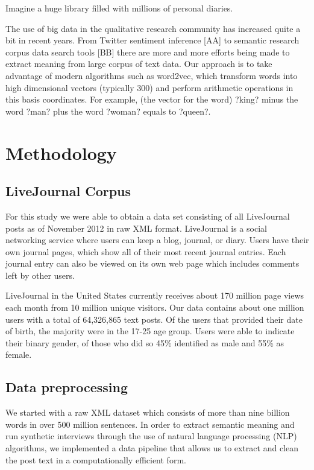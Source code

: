 \documentclass{sigchi}
\begin{document}
Imagine a huge library filled with millions of personal diaries. 

The use of big data in the qualitative research community has increased quite a bit in recent years. From Twitter sentiment inference [AA] to semantic research corpus data search tools [BB] there are more and more efforts being made to extract meaning from large corpus of text data. Our approach is to take advantage of modern algorithms such as word2vec, which transform words into high dimensional vectors (typically 300) and perform arithmetic operations in this basis coordinates. For example, (the vector for the word) ?king? minus the word ?man? plus the word ?woman? equals to ?queen?.

\section{Methodology}

\subsection{LiveJournal Corpus}
For this study we were able to obtain a data set consisting of all LiveJournal posts as of November 2012 in raw XML format. LiveJournal is a social networking service where users can keep a blog, journal, or diary. Users have their own journal pages, which show all of their most recent journal entries. Each journal entry can also be viewed on its own web page which includes comments left by other users. 

LiveJournal in the United States currently receives about 170 million page views each month from 10 million unique visitors. Our data contains about one million users with a total of 64,326,865 text posts. Of the users that provided their date of birth, the majority were in the 17-25 age group. Users were able to indicate their binary gender, of those who did so 45\% identified as male and 55\% as female. 

\subsection{Data preprocessing}

We started with a raw XML dataset which consists of more than nine billion words in over 500 million sentences. In order to extract semantic meaning and run synthetic interviews through the use of natural language processing (NLP) algorithms, we implemented a data pipeline that allows us to extract and clean the post text in a computationally efficient form. 
\end{document}
